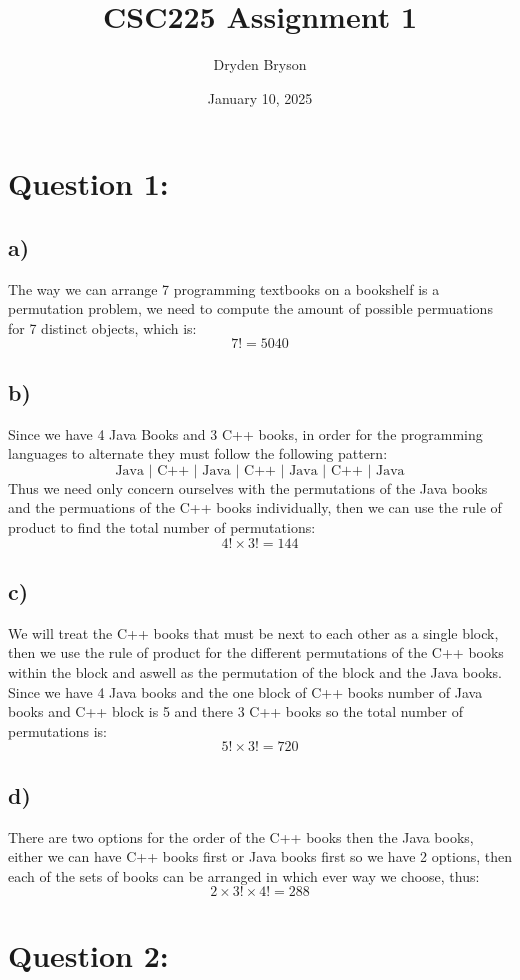 \documentclass{article}
\title{CSC225 Assignment 1}
\author{Dryden Bryson}
\date{January 10, 2025}
\begin{document}
\maketitle
\newpage
\section*{Question 1:}
\subsection*{a)}
The way we can arrange 7 programming textbooks on a bookshelf is a permutation problem, we need to compute the amount of possible permuations for 7 distinct objects, which is: 
$$7!=\boxed{5040}$$

\subsection*{b)}
Since we have 4 Java Books and 3 C++ books, in order for the programming languages to alternate they must follow the following pattern: $$\text{Java  |  C++  |  Java  |  C++  |  Java  |  C++  |  Java}$$ 
Thus we need only concern ourselves with the permutations of the Java books and the permuations of the C++ books individually, then we can use the rule of product to find the total number of permutations: $$4! \times 3! = \boxed{144}$$

\subsection*{c)}
We will treat the C++ books that must be next to each other as a single block, then we use the rule of product for the different permutations of the C++ books within the block and aswell as the permutation of the block and the Java books. Since we have 4 Java books and the one block of C++ books number of Java books and C++ block is 5 and there 3 C++ books so the total number of permutations is: $$5!\times 3!=\boxed{720}$$

\subsection*{d)}
There are two options for the order of the C++ books then the Java books, either we can have C++ books first or Java books first so we have 2 options, then each of the sets of books can be arranged in which ever way we choose, thus: $$2\times 3! \times 4! = \boxed{288}$$

\newpage
\section*{Question 2:}
\end{document}
